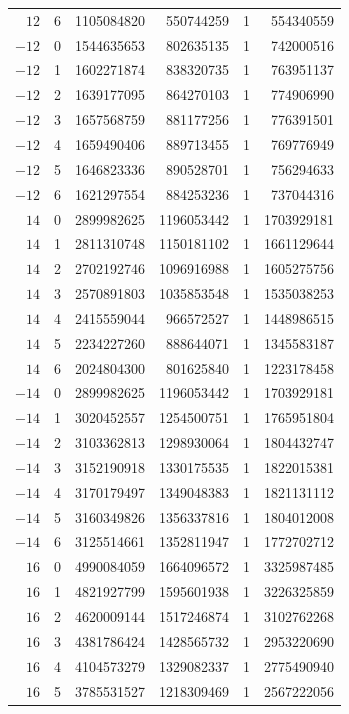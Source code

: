 {\begin{longtable}{rrrrrr}
$12$ & 6 & 1105084820 & 550744259 & 1 & 554340559\\
$-12$ & 0 & 1544635653 & 802635135 & 1 & 742000516\\
$-12$ & 1 & 1602271874 & 838320735 & 1 & 763951137\\
$-12$ & 2 & 1639177095 & 864270103 & 1 & 774906990\\
$-12$ & 3 & 1657568759 & 881177256 & 1 & 776391501\\
$-12$ & 4 & 1659490406 & 889713455 & 1 & 769776949\\
$-12$ & 5 & 1646823336 & 890528701 & 1 & 756294633\\
$-12$ & 6 & 1621297554 & 884253236 & 1 & 737044316\\
$14$ & 0 & 2899982625 & 1196053442 & 1 & 1703929181\\
$14$ & 1 & 2811310748 & 1150181102 & 1 & 1661129644\\
$14$ & 2 & 2702192746 & 1096916988 & 1 & 1605275756\\
$14$ & 3 & 2570891803 & 1035853548 & 1 & 1535038253\\
$14$ & 4 & 2415559044 & 966572527 & 1 & 1448986515\\
$14$ & 5 & 2234227260 & 888644071 & 1 & 1345583187\\
$14$ & 6 & 2024804300 & 801625840 & 1 & 1223178458\\
$-14$ & 0 & 2899982625 & 1196053442 & 1 & 1703929181\\
$-14$ & 1 & 3020452557 & 1254500751 & 1 & 1765951804\\
$-14$ & 2 & 3103362813 & 1298930064 & 1 & 1804432747\\
$-14$ & 3 & 3152190918 & 1330175535 & 1 & 1822015381\\
$-14$ & 4 & 3170179497 & 1349048383 & 1 & 1821131112\\
$-14$ & 5 & 3160349826 & 1356337816 & 1 & 1804012008\\
$-14$ & 6 & 3125514661 & 1352811947 & 1 & 1772702712\\
$16$ & 0 & 4990084059 & 1664096572 & 1 & 3325987485\\
$16$ & 1 & 4821927799 & 1595601938 & 1 & 3226325859\\
$16$ & 2 & 4620009144 & 1517246874 & 1 & 3102762268\\
$16$ & 3 & 4381786424 & 1428565732 & 1 & 2953220690\\
$16$ & 4 & 4104573279 & 1329082337 & 1 & 2775490940\\
$16$ & 5 & 3785531527 & 1218309469 & 1 & 2567222056\\

\end{longtable}}
